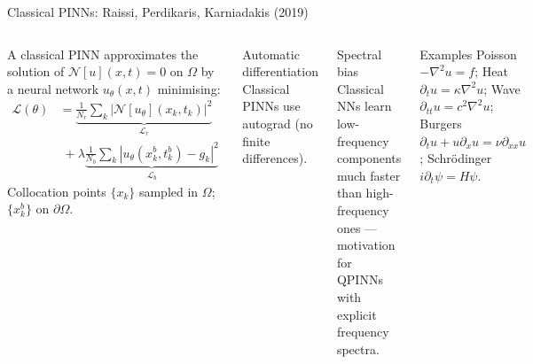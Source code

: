 \documentclass[aspectratio=169,11pt]{beamer}
\begin{document}
\begin{frame}{Classical PINNs: Raissi, Perdikaris, Karniadakis (2019)}
\small
  \begin{columns}[T]
    A classical PINN approximates the solution of
    $\mathcal{N}[u](x,t)=0$ on $\Omega$ by a neural network
    $u_\theta(x,t)$ minimising:
    \begin{align*}
      \mathcal{L}(\theta)
      &= \underbrace{\tfrac{1}{N_r}\textstyle\sum_k
          |\mathcal{N}[u_\theta](x_k,t_k)|^2}_{\mathcal{L}_r}\\
      &\;+ \lambda\underbrace{\tfrac{1}{N_b}\textstyle\sum_k
          |u_\theta(x_k^b,t_k^b)-g_k|^2}_{\mathcal{L}_b}
    \end{align*}
    Collocation points $\{x_k\}$ sampled in $\Omega$;
    $\{x_k^b\}$ on $\partial\Omega$.
    \begin{block}{Automatic differentiation}\footnotesize
      Classical PINNs use autograd (no finite differences).
    \end{block}
    \begin{alertblock}{Spectral bias}
      Classical NNs learn low-frequency components much
      faster than high-frequency ones ---
      motivation for QPINNs with explicit frequency spectra.
    \end{alertblock}
    \begin{block}{Examples}\footnotesize
      Poisson $-\nabla^2 u\!=\!f$;\;
      Heat $\partial_t u\!=\!\kappa\nabla^2 u$;\;
      Wave $\partial_{tt}u\!=\!c^2\nabla^2 u$;\;
      Burgers $\partial_t u\!+\!u\partial_x u\!=\!\nu\partial_{xx}u$;\;
      Schr\"odinger $i\partial_t\psi\!=\!H\psi$.
    \end{block}
  \end{columns}
\end{frame}
\end{document}
